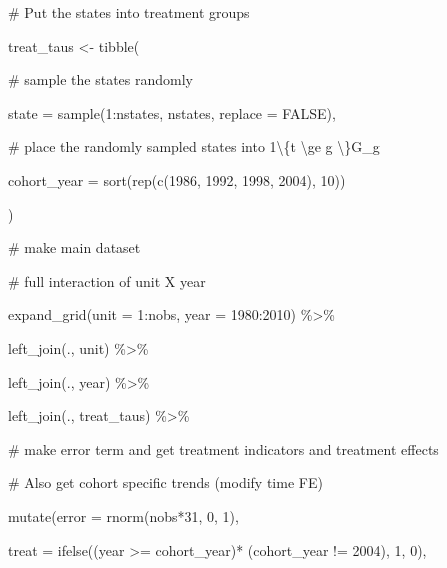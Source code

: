 \documentclass[
  letterpaper,
  DIV=11,
  numbers=noendperiod]{scrartcl}
\newenvironment{Shaded}{\begin{snugshade}}{\end{snugshade}}
\newcommand{\AttributeTok}[1]{\textcolor[rgb]{0.40,0.45,0.13}{#1}}
\newcommand{\CommentTok}[1]{\textcolor[rgb]{0.37,0.37,0.37}{#1}}
\newcommand{\ConstantTok}[1]{\textcolor[rgb]{0.56,0.35,0.01}{#1}}
\newcommand{\DecValTok}[1]{\textcolor[rgb]{0.68,0.00,0.00}{#1}}
\newcommand{\FunctionTok}[1]{\textcolor[rgb]{0.28,0.35,0.67}{#1}}
\newcommand{\NormalTok}[1]{\textcolor[rgb]{0.00,0.23,0.31}{#1}}
\newcommand{\OtherTok}[1]{\textcolor[rgb]{0.00,0.23,0.31}{#1}}
\newcommand{\SpecialCharTok}[1]{\textcolor[rgb]{0.37,0.37,0.37}{#1}}
\begin{document}
\begin{Shaded}
\begin{Highlighting}[]
  \CommentTok{\# Put the states into treatment groups}

\NormalTok{  treat\_taus }\OtherTok{\textless{}{-}} \FunctionTok{tibble}\NormalTok{(}

    \CommentTok{\# sample the states randomly}

    \AttributeTok{state =} \FunctionTok{sample}\NormalTok{(}\DecValTok{1}\SpecialCharTok{:}\NormalTok{nstates, nstates, }\AttributeTok{replace =} \ConstantTok{FALSE}\NormalTok{),}

    \CommentTok{\# place the randomly sampled states into 1\textbackslash{}\{t \textbackslash{}ge g \textbackslash{}\}G\_g}

    \AttributeTok{cohort\_year =} \FunctionTok{sort}\NormalTok{(}\FunctionTok{rep}\NormalTok{(}\FunctionTok{c}\NormalTok{(}\DecValTok{1986}\NormalTok{, }\DecValTok{1992}\NormalTok{, }\DecValTok{1998}\NormalTok{, }\DecValTok{2004}\NormalTok{), }\DecValTok{10}\NormalTok{))}

\NormalTok{  )}

 

  \CommentTok{\# make main dataset}

  \CommentTok{\# full interaction of unit X year}

  \FunctionTok{expand\_grid}\NormalTok{(}\AttributeTok{unit =} \DecValTok{1}\SpecialCharTok{:}\NormalTok{nobs, }\AttributeTok{year =} \DecValTok{1980}\SpecialCharTok{:}\DecValTok{2010}\NormalTok{) }\SpecialCharTok{\%\textgreater{}\%}

    \FunctionTok{left\_join}\NormalTok{(., unit) }\SpecialCharTok{\%\textgreater{}\%}

    \FunctionTok{left\_join}\NormalTok{(., year) }\SpecialCharTok{\%\textgreater{}\%}

    \FunctionTok{left\_join}\NormalTok{(., treat\_taus) }\SpecialCharTok{\%\textgreater{}\%}

    \CommentTok{\# make error term and get treatment indicators and treatment effects}

    \CommentTok{\# Also get cohort specific trends (modify time FE)}

    \FunctionTok{mutate}\NormalTok{(}\AttributeTok{error =} \FunctionTok{rnorm}\NormalTok{(nobs}\SpecialCharTok{*}\DecValTok{31}\NormalTok{, }\DecValTok{0}\NormalTok{, }\DecValTok{1}\NormalTok{),}

           \AttributeTok{treat =} \FunctionTok{ifelse}\NormalTok{((year }\SpecialCharTok{\textgreater{}=}\NormalTok{ cohort\_year)}\SpecialCharTok{*}\NormalTok{ (cohort\_year }\SpecialCharTok{!=} \DecValTok{2004}\NormalTok{), }\DecValTok{1}\NormalTok{, }\DecValTok{0}\NormalTok{),}


\end{Highlighting}
\end{Shaded}
\end{document}
